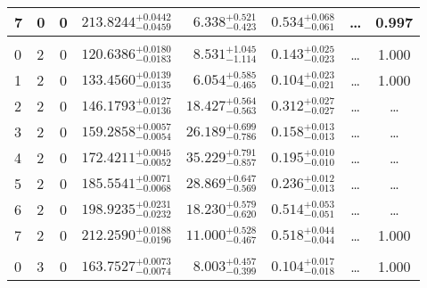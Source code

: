 \begin{table*}[!]
\begin{tabular}{llcrrlrc}
7 & 0 & 0 & $    213.8244_{-      0.0459}^{+      0.0442}$ & $       6.338_{-       0.423}^{+       0.521}$ & $       0.534_{-       0.061}^{+       0.068}$ & \multicolumn{1}{c}{\dots} & 0.997\\[1pt]
\hline \\[-8pt]
0 & 2 & 0 & $    120.6386_{-      0.0183}^{+      0.0180}$ & $       8.531_{-       1.114}^{+       1.045}$ & $       0.143_{-       0.023}^{+       0.025}$ & \multicolumn{1}{c}{\dots} & 1.000\\[1pt]
1 & 2 & 0 & $    133.4560_{-      0.0135}^{+      0.0139}$ & $       6.054_{-       0.465}^{+       0.585}$ & $       0.104_{-       0.021}^{+       0.023}$ & \multicolumn{1}{c}{\dots} & 1.000\\[1pt]
2 & 2 & 0 & $    146.1793_{-      0.0136}^{+      0.0127}$ & $      18.427_{-       0.563}^{+       0.564}$ & $       0.312_{-       0.027}^{+       0.027}$ & \multicolumn{1}{c}{\dots} & \dots \\[1pt]
3 & 2 & 0 & $    159.2858_{-      0.0054}^{+      0.0057}$ & $      26.189_{-       0.786}^{+       0.699}$ & $       0.158_{-       0.013}^{+       0.013}$ & \multicolumn{1}{c}{\dots} & \dots \\[1pt]
4 & 2 & 0 & $    172.4211_{-      0.0052}^{+      0.0045}$ & $      35.229_{-       0.857}^{+       0.791}$ & $       0.195_{-       0.010}^{+       0.010}$ & \multicolumn{1}{c}{\dots} & \dots \\[1pt]
5 & 2 & 0 & $    185.5541_{-      0.0068}^{+      0.0071}$ & $      28.869_{-       0.569}^{+       0.647}$ & $       0.236_{-       0.013}^{+       0.012}$ & \multicolumn{1}{c}{\dots} & \dots \\[1pt]
6 & 2 & 0 & $    198.9235_{-      0.0232}^{+      0.0231}$ & $      18.230_{-       0.620}^{+       0.579}$ & $       0.514_{-       0.051}^{+       0.053}$ & \multicolumn{1}{c}{\dots} & \dots \\[1pt]
7 & 2 & 0 & $    212.2590_{-      0.0196}^{+      0.0188}$ & $      11.000_{-       0.467}^{+       0.528}$ & $       0.518_{-       0.044}^{+       0.044}$ & \multicolumn{1}{c}{\dots} & 1.000\\[1pt]
\hline \\[-8pt]
0 & 3 & 0 & $    163.7527_{-      0.0074}^{+      0.0073}$ & $       8.003_{-       0.399}^{+       0.457}$ & $       0.104_{-       0.018}^{+       0.017}$ & \multicolumn{1}{c}{\dots} & 1.000\\[1pt]
\hline
\end{tabular}
\end{table*}